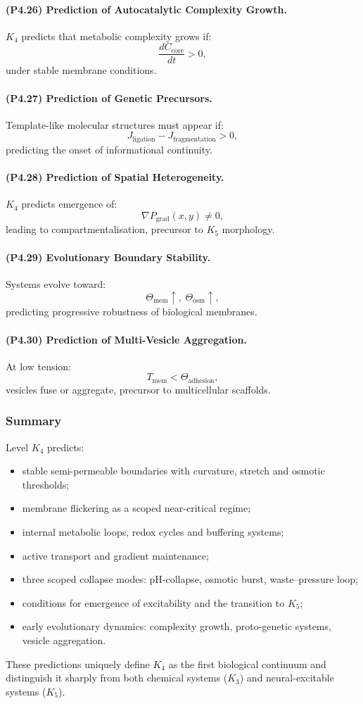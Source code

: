\paragraph{(P4.26) Prediction of Autocatalytic Complexity Growth.}
$K_4$ predicts that metabolic complexity grows if:
\[
\frac{dC_{\mathrm{core}}}{dt} > 0,
\]
under stable membrane conditions.

\paragraph{(P4.27) Prediction of Genetic Precursors.}
Template-like molecular structures must appear if:
\[
J_{\mathrm{ligation}} - J_{\mathrm{fragmentation}} > 0,
\]
predicting the onset of informational continuity.

\paragraph{(P4.28) Prediction of Spatial Heterogeneity.}
$K_4$ predicts emergence of:
\[
\nabla P_{\mathrm{grad}}(x,y) \neq 0,
\]
leading to compartmentalisation, precursor to $K_5$ morphology.

\paragraph{(P4.29) Evolutionary Boundary Stability.}
Systems evolve toward:
\[
\Theta_{\mathrm{mem}} \uparrow,\ \Theta_{\mathrm{osm}} \uparrow,
\]
predicting progressive robustness of biological membranes.

\paragraph{(P4.30) Prediction of Multi-Vesicle Aggregation.}
At low tension:
\[
T_{\mathrm{mem}} < \Theta_{\mathrm{adhesion}},
\]
vesicles fuse or aggregate, precursor to multicellular scaffolds.

\subsubsection{Summary}

Level $K_4$ predicts:
\begin{itemize}
    \item stable semi-permeable boundaries with curvature, stretch and osmotic thresholds;
    \item membrane flickering as a scoped near-critical regime;
    \item internal metabolic loops, redox cycles and buffering systems;
    \item active transport and gradient maintenance;
    \item three scoped collapse modes: pH-collapse, osmotic burst, waste–pressure loop;
    \item conditions for emergence of excitability and the transition to $K_5$;
    \item early evolutionary dynamics: complexity growth, proto-genetic systems, vesicle aggregation.
\end{itemize}

These predictions uniquely define $K_4$ as the first biological continuum and
distinguish it sharply from both chemical systems ($K_3$) and neural-excitable
systems ($K_5$).
